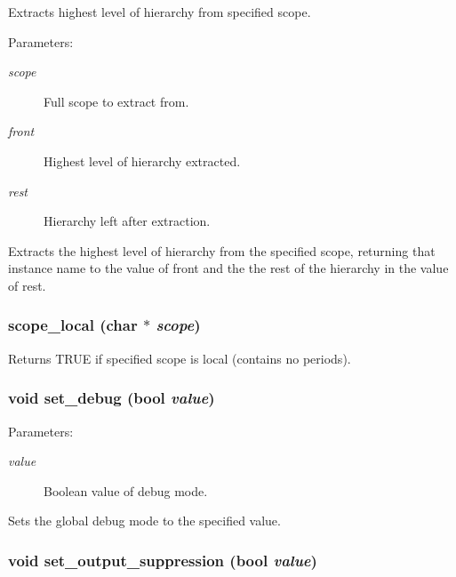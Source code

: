 Extracts highest level of hierarchy from specified scope.

\begin{Desc}
\item[Parameters: ]\par
\begin{description}
\item[{\em 
scope}]Full scope to extract from. \item[{\em 
front}]Highest level of hierarchy extracted. \item[{\em 
rest}]Hierarchy left after extraction.\end{description}
\end{Desc}
Extracts the highest level of hierarchy from the specified scope, returning that instance name to the value of front and the the rest of the hierarchy in the value of rest. 
\subsubsection{ scope\_\-local (char $\ast$ {\em scope})}\label{util_8c_a15}


Returns TRUE if specified scope is local (contains no periods).

\subsubsection{\setlength{\rightskip}{0pt plus 5cm}void set\_\-debug ({\bf bool} {\em value})}\label{util_8c_a5}


\begin{Desc}
\item[Parameters: ]\par
\begin{description}
\item[{\em 
value}]Boolean value of debug mode.\end{description}
\end{Desc}
Sets the global debug mode to the specified value. 
\subsubsection{\setlength{\rightskip}{0pt plus 5cm}void set\_\-output\_\-suppression ({\bf bool} {\em value})}\label{util_8c_a4}


